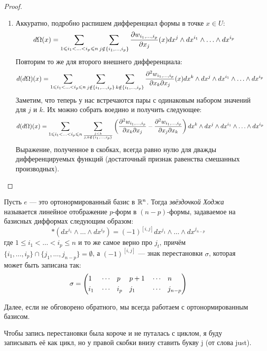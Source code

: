\begin{proof}
\begin{enumerate}
		\item Аккуратно, подробно распишем дифференциал формы в точке $x \in U$:
		\[
			d\Omega(x) = \sum_{1 \leqslant i_1 < \ldots < i_p \leqslant n} \sum_{j \notin \{i_1, \ldots, i_p\}} \frac{\partial w_{i_1, \ldots, i_p}}{\partial x_j}(x) dx^j \wedge dx^{i_1} \wedge \ldots \wedge dx^{i_p}
		\]
		Повторим то же для второго внешнего дифференциала:
		\[
			d(d\Omega)(x) = \sum_{1 \leqslant i_1 < \ldots < i_p \leqslant n} \sum_{j \notin \{i_1, \ldots, i_p\}} \sum_{k \notin \{i_1, \ldots, i_p\}} \frac{\partial ^2 w_{i_1, \ldots, i_p}}{\partial x_k \partial x_j}(x) dx^k \wedge dx^j \wedge dx^{i_1} \wedge \ldots \wedge dx^{i_p}
		\]
		Заметим, что теперь у нас встречаются пары с одинаковым набором значений для $j$ и $k$. Их можно собрать воедино и получить следующее:
		\[
			d(d\Omega)(x) = \sum_{1 \leqslant i_1 < \ldots < i_p \leqslant n} \sum_{j < k \over {j, k \notin \{i_1, \ldots, i_p\}}} \left(\frac{\partial ^2 w_{i_1, \ldots, i_p}}{\partial x_k \partial x_j} - \frac{\partial ^2 w_{i_1, \ldots, i_p}}{\partial x_j \partial x_k}\right) dx^k \wedge dx^j \wedge dx^{i_1} \wedge \ldots \wedge dx^{i_p}
		\]
		Выражение, полученное в скобках, всегда равно нулю для дважды дифференцируемых функций (достаточный признак равенства смешанных производных).
	\end{enumerate}
\end{proof}

\begin{definition}
	Пусть $e$ --- это ортонормированный базис в $\mathbb{R}^n$. Тогда \textit{звёздочкой Ходжа} называется линейное отображение $p$-форм в $(n - p)$-формы, задаваемое на базисных дифформах следующим образом:
	\[
		*(dx^{i_1} \wedge \ldots \wedge dx^{i_p}) = (-1)^{[i, j]} dx^{j_1} \wedge \ldots \wedge dx^{j_{n - p}}
	\]
	где $1 \le i_1 < \ldots < i_p \le n$ и то же самое верно про $j_t$, причём $\{i_1, \ldots, i_p\} \cap \{j_1, \ldots, j_{n - p}\} = \emptyset$, а $(-1)^{[i, j]}$ --- знак перестановки $\sigma$, которая может быть записана так:
	\[
		\sigma = \left( \begin{aligned} 
			&1& &\cdots& &p& &p + 1& &\cdots& &n
			\\
			&i_1& &\cdots& &i_p& &j_1& &\cdots& &j_{n - p}
		 \end{aligned} \right)
	\]
\end{definition}

\begin{note}
	Далее, если не обговорено обратного, мы всегда работаем с ортонормированным базисом.
\end{note}

\begin{anote}
	Чтобы запись перестановки была короче и не путалась с циклом, я буду записывать её как цикл, но у правой скобки внизу ставить букву j (от слова just).
\end{anote}

